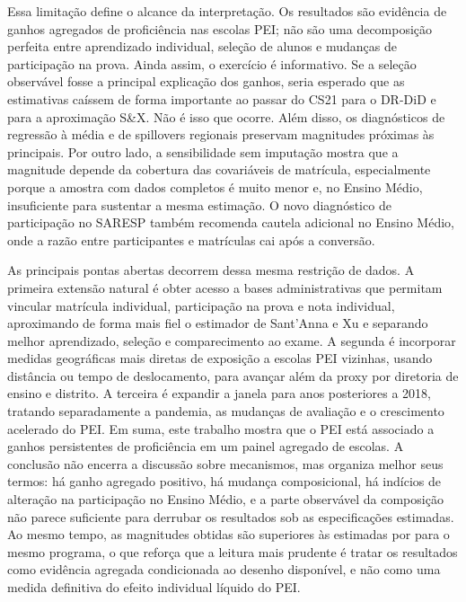 Essa limitação define o alcance da interpretação. Os resultados são evidência de ganhos agregados de proficiência nas escolas PEI; não são uma decomposição perfeita entre aprendizado individual, seleção de alunos e mudanças de participação na prova. Ainda assim, o exercício é informativo. Se a seleção observável fosse a principal explicação dos ganhos, seria esperado que as estimativas caíssem de forma importante ao passar do CS21 para o DR-DiD e para a aproximação S\&X. Não é isso que ocorre. Além disso, os diagnósticos de regressão à média e de spillovers regionais preservam magnitudes próximas às principais. Por outro lado, a sensibilidade sem imputação mostra que a magnitude depende da cobertura das covariáveis de matrícula, especialmente porque a amostra com dados completos é muito menor e, no Ensino Médio, insuficiente para sustentar a mesma estimação. O novo diagnóstico de participação no SARESP também recomenda cautela adicional no Ensino Médio, onde a razão entre participantes e matrículas cai após a conversão.

As principais pontas abertas decorrem dessa mesma restrição de dados. A primeira extensão natural é obter acesso a bases administrativas que permitam vincular matrícula individual, participação na prova e nota individual, aproximando de forma mais fiel o estimador de Sant'Anna e Xu e separando melhor aprendizado, seleção e comparecimento ao exame. A segunda é incorporar medidas geográficas mais diretas de exposição a escolas PEI vizinhas, usando distância ou tempo de deslocamento, para avançar além da proxy por diretoria de ensino e distrito. A terceira é expandir a janela para anos posteriores a 2018, tratando separadamente a pandemia, as mudanças de avaliação e o crescimento acelerado do PEI. Em suma, este trabalho mostra que o PEI está associado a ganhos persistentes de proficiência em um painel agregado de escolas. A conclusão não encerra a discussão sobre mecanismos, mas organiza melhor seus termos: há ganho agregado positivo, há mudança composicional, há indícios de alteração na participação no Ensino Médio, e a parte observável da composição não parece suficiente para derrubar os resultados sob as especificações estimadas. Ao mesmo tempo, as magnitudes obtidas são superiores às estimadas por \textcite{scorzafave2023} para o mesmo programa, o que reforça que a leitura mais prudente é tratar os resultados como evidência agregada condicionada ao desenho disponível, e não como uma medida definitiva do efeito individual líquido do PEI.
